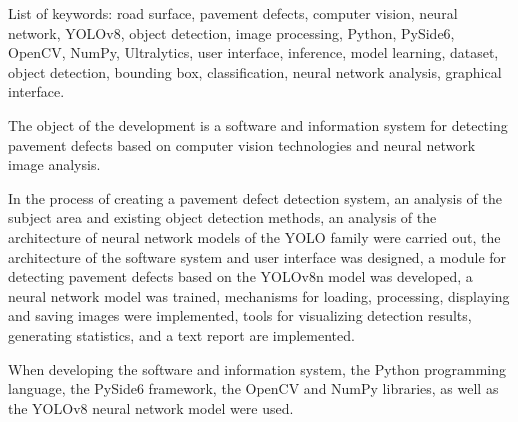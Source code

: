 List of keywords: road surface, pavement defects, computer vision, neural network, YOLOv8, object detection, image processing, Python, PySide6, OpenCV, NumPy, Ultralytics, user interface, inference, model learning, dataset, object detection, bounding box, classification, neural network analysis, graphical interface.

The object of the development is a software and information system for detecting pavement defects based on computer vision technologies and neural network image analysis.

In the process of creating a pavement defect detection system, an analysis of the subject area and existing object detection methods, an analysis of the architecture of neural network models of the YOLO family were carried out, the architecture of the software system and user interface was designed, a module for detecting pavement defects based on the YOLOv8n model was developed, a neural network model was trained, mechanisms for loading, processing, displaying and saving images were implemented, tools for visualizing detection results, generating statistics, and a text report are implemented.

When developing the software and information system, the Python programming language, the PySide6 framework, the OpenCV and NumPy libraries, as well as the YOLOv8 neural network model were used.
